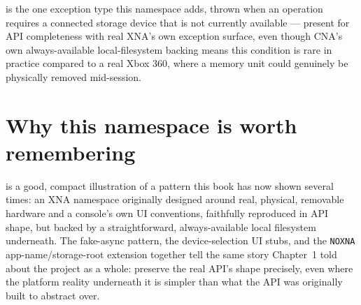  is the one exception type this namespace adds,
thrown when an operation requires a connected storage device that is not currently available
--- present for API completeness with real XNA's own exception surface, even though CNA's own
always-available local-filesystem backing means this condition is rare in practice compared
to a real Xbox 360, where a memory unit could genuinely be physically removed mid-session.

\section{Why this namespace is worth remembering}

 is a good, compact illustration of a pattern this book has now shown several
times: an XNA namespace originally designed around real, physical, removable hardware and a
console's own UI conventions, faithfully reproduced in API shape, but backed by a
straightforward, always-available local filesystem underneath. The fake-async pattern, the
device-selection UI stubs, and the \texttt{NOXNA} app-name/storage-root extension together
tell the same story Chapter~1 told about the project as a whole: preserve the real API's
shape precisely, even where the platform reality underneath it is simpler than what the API
was originally built to abstract over.
